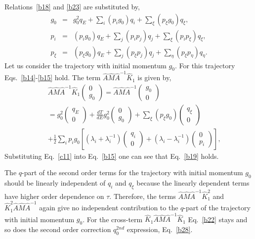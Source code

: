 \documentclass[journal=jpcafh,manuscript=article]{achemso}
\begin{document}
Relations~\ref{b18} and \ref{b23} are substituted by,
\begin{eqnarray}
  \label{c11}
  g_0&=&g_0^2q_E+\sum_i(p_ig_0)q_i+\sum_\xi(p_\xi g_0)q_\xi,
  \\
  \label{c12}
  p_i&=&(p_ig_0)q_E+\sum_j(p_ip_j)q_j+\sum_\xi(p_ip_\xi)q_\xi,
  \\
  \label{c13}
  p_\xi&=&(p_\xi g_0)q_E+\sum_j(p_\xi p_j)q_j+\sum_\eta(p_\xi p_\eta)q_\eta.
\end{eqnarray}
Let us consider the trajectory with initial momentum $g_0$.  For this
trajectory Eqs.~\ref{b14}-\ref{b15} hold.  The term
$\hat{A}\hat{M}\hat{A}^{-1}\hat{K}_1$ is given by,
\begin{eqnarray}
  \nonumber
  &&\hat{A}\hat{M}\hat{A}^{-1}\hat{K}_1\left(\begin{array}{c}0\\g_0\end{array}\right)
  =\hat{A}\hat{M}\hat{A}^{-1}\left(\begin{array}{c}g_0\\0\end{array}\right)
  \\
  \label{c15}
  &&=g_0^2\left(\begin{array}{c}q_E\\0\end{array}\right)+\frac{dT}{dE}g_0^2\left(\begin{array}{c}0\\g_0\end{array}\right)
  +\sum_\xi(p_\xi g_0)\left(\begin{array}{c}q_\xi\\0\end{array}\right)
  \\
  \nonumber
  &&+\frac{1}{2}\sum_i p_ig_0\left[(\lambda_i+\lambda_i^{-1})\left(\begin{array}{c}q_i\\0\end{array}\right)
  +(\lambda_i-\lambda_i^{-1})\left(\begin{array}{c}0\\p_i\end{array}\right)\right],
\end{eqnarray}
Substituting Eq.~\ref{c11} into Eq.~\ref{b15} one can see that
Eq.~\ref{b19} holds.

The $q$-part of the second order terms for the trajectory with
initial momentum $g_0$ should be linearly independent of $q_i$ and
$q_\xi$ because the linearly dependent terms have higher order
dependence on $\tau$. Therefore, the terms
$\hat{A}\hat{M}\hat{A}^{-1}\hat{K}^2_1$ and
$\hat{K}^2_1\hat{A}\hat{M}\hat{A}^{-1}$ again give no independent
contribution to the $q$-part of the trajectory with initial
momentum $g_0$. For the cross-term
$\hat{K}_1\hat{A}\hat{M}\hat{A}^{-1}\hat{K}_1$ Eq.~\ref{b22} stays and
so does the second order correction $q^{2nd}_0$ expression,
Eq.~\ref{b28}.
\end{document}
